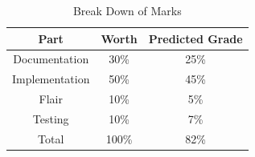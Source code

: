 \documentclass[11pt, a4paper]{article}
\begin{document}
\begin{table}[h]
\centering
\begin{tabular}{|c|c|c|}\hline
\textbf{Part} & \textbf{Worth} & \textbf{Predicted Grade} \\ \hline
Documentation & 30\% & 25\% \\ 
Implementation & 50\% & 45\% \\ 
Flair & 10\% & 5\% \\ 
Testing & 10\% & 7\% \\ \hline
Total & 100\% & 82\% \\ \hline
\end{tabular}
\caption{Break Down of Marks}\label{tab:marks}
\end{table}

\newpage
\end{document}
